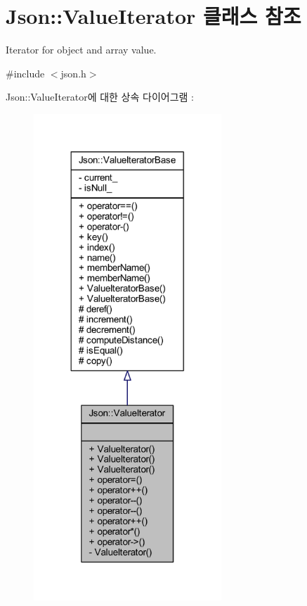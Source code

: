 \hypertarget{class_json_1_1_value_iterator}{}\section{Json\+:\+:Value\+Iterator 클래스 참조}
\label{class_json_1_1_value_iterator}


Iterator for object and array value.  




{\ttfamily \#include $<$json.\+h$>$}



Json\+:\+:Value\+Iterator에 대한 상속 다이어그램 \+: \nopagebreak
\begin{figure}[H]
\begin{center}
\leavevmode
\includegraphics[width=200pt]{class_json_1_1_value_iterator__inherit__graph}
\end{center}
\end{figure}


